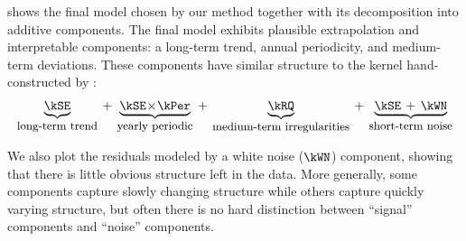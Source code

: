  shows the final model chosen by our method together with its decomposition into additive components.
The final model exhibits plausible extrapolation and interpretable components: a long-term trend, annual periodicity, and medium-term deviations.
These components have similar structure to the kernel hand-constructed by \citet[chapter 5]{rasmussen38gaussian}:
%
\begin{align}
\underwrite{\kSE}{\small long-term trend}
\kernplus
\underwrite{\kSE \kerntimes \kPer}{\small yearly periodic}
\kernplus
\underwrite{\kRQ}{\small medium-term irregularities}
\kernplus 
\underwrite{\kSE \kernplus \kWN}{\small short-term noise}
\end{align}

We also plot the residuals modeled by a white noise ($\kWN$) component, showing that there is little obvious structure left in the data.
More generally, some components capture slowly changing structure while others capture quickly varying structure, but often there is no hard distinction between ``signal'' components and ``noise'' components.

